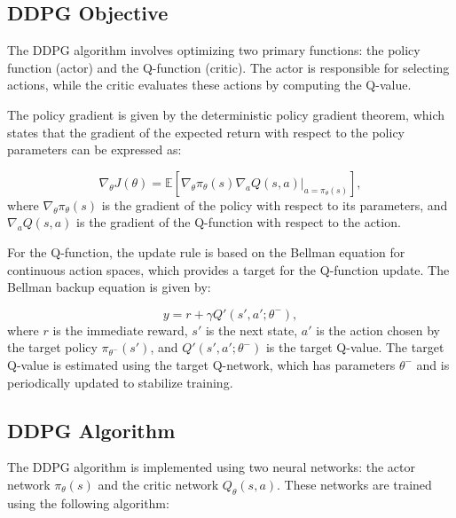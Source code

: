 \documentclass[conference]{IEEEtran}
\begin{document}
\subsection{DDPG Objective}

The DDPG algorithm involves optimizing two primary functions: the policy function (actor) and the Q-function (critic). The actor is responsible for selecting actions, while the critic evaluates these actions by computing the Q-value.

The policy gradient is given by the deterministic policy gradient theorem, which states that the gradient of the expected return with respect to the policy parameters can be expressed as:

\begin{equation}
    \nabla_{\theta} J(\theta) = \mathbb{E} \left[ \nabla_{\theta} \pi_{\theta}(s) \nabla_a Q(s, a) |_{a = \pi_{\theta}(s)} \right],
\end{equation}
where \( \nabla_{\theta} \pi_{\theta}(s) \) is the gradient of the policy with respect to its parameters, and \( \nabla_a Q(s, a) \) is the gradient of the Q-function with respect to the action.

For the Q-function, the update rule is based on the Bellman equation for continuous action spaces, which provides a target for the Q-function update. The Bellman backup equation is given by:

\begin{equation}
    y = r + \gamma Q'(s', a'; \theta^-),
\end{equation}
where \( r \) is the immediate reward, \( s' \) is the next state, \( a' \) is the action chosen by the target policy \( \pi_{\theta^-}(s') \), and \( Q'(s', a'; \theta^-) \) is the target Q-value. The target Q-value is estimated using the target Q-network, which has parameters \( \theta^- \) and is periodically updated to stabilize training.

\subsection{DDPG Algorithm}

The DDPG algorithm is implemented using two neural networks: the actor network \( \pi_{\theta}(s) \) and the critic network \( Q_{\theta}(s, a) \). These networks are trained using the following algorithm:
\end{document}
